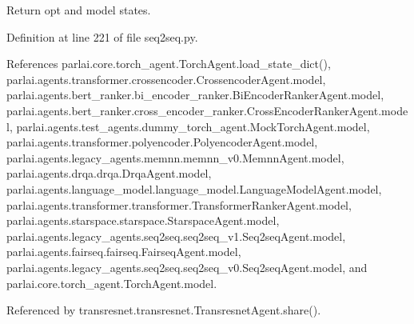 \begin{DoxyVerb}Return opt and model states.\end{DoxyVerb}
 

Definition at line 221 of file seq2seq.\+py.



References parlai.\+core.\+torch\+\_\+agent.\+Torch\+Agent.\+load\+\_\+state\+\_\+dict(), parlai.\+agents.\+transformer.\+crossencoder.\+Crossencoder\+Agent.\+model, parlai.\+agents.\+bert\+\_\+ranker.\+bi\+\_\+encoder\+\_\+ranker.\+Bi\+Encoder\+Ranker\+Agent.\+model, parlai.\+agents.\+bert\+\_\+ranker.\+cross\+\_\+encoder\+\_\+ranker.\+Cross\+Encoder\+Ranker\+Agent.\+model, parlai.\+agents.\+test\+\_\+agents.\+dummy\+\_\+torch\+\_\+agent.\+Mock\+Torch\+Agent.\+model, parlai.\+agents.\+transformer.\+polyencoder.\+Polyencoder\+Agent.\+model, parlai.\+agents.\+legacy\+\_\+agents.\+memnn.\+memnn\+\_\+v0.\+Memnn\+Agent.\+model, parlai.\+agents.\+drqa.\+drqa.\+Drqa\+Agent.\+model, parlai.\+agents.\+language\+\_\+model.\+language\+\_\+model.\+Language\+Model\+Agent.\+model, parlai.\+agents.\+transformer.\+transformer.\+Transformer\+Ranker\+Agent.\+model, parlai.\+agents.\+starspace.\+starspace.\+Starspace\+Agent.\+model, parlai.\+agents.\+legacy\+\_\+agents.\+seq2seq.\+seq2seq\+\_\+v1.\+Seq2seq\+Agent.\+model, parlai.\+agents.\+fairseq.\+fairseq.\+Fairseq\+Agent.\+model, parlai.\+agents.\+legacy\+\_\+agents.\+seq2seq.\+seq2seq\+\_\+v0.\+Seq2seq\+Agent.\+model, and parlai.\+core.\+torch\+\_\+agent.\+Torch\+Agent.\+model.



Referenced by transresnet.\+transresnet.\+Transresnet\+Agent.\+share().

